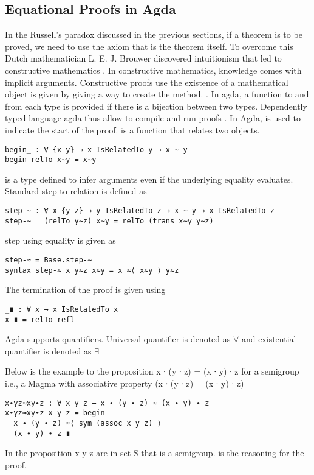 \subsection{Equational Proofs in Agda}
In the Russell's paradox discussed in the previous sections, if a theorem is to
be proved, we need to use the axiom that is the theorem itself. To overcome this
Dutch mathematician L. E. J. Brouwer discovered intuitionism that led to
constructive mathematics \cite{enwiki:1122615242}. In constructive mathematics,
knowledge comes with implicit arguments. Constructive proofs use the existence
of a mathematical object is given by giving a way to create the method.
\cite{enwiki:1090644431}. In agda, a function to and from each type is
provided if there is a bijection between two types. Dependently typed language
agda thus allow to compile and run proofs \cite{kidney2020finiteness}.  
In Agda,  is used to indicate the start of the proof.  is a
function that relates two objects. 
\begin{verbatim}
begin_ : ∀ {x y} → x IsRelatedTo y → x ∼ y
begin relTo x∼y = x∼y
\end{verbatim}
 is a type defined to infer arguments even if the underlying equality
evaluates. Standard step to relation is defined as 
\begin{verbatim}
step-∼ : ∀ x {y z} → y IsRelatedTo z → x ∼ y → x IsRelatedTo z
step-∼ _ (relTo y∼z) x∼y = relTo (trans x∼y y∼z)
\end{verbatim}
step using equality is given as
\begin{verbatim}
step-≈ = Base.step-∼
syntax step-≈ x y≈z x≈y = x ≈⟨ x≈y ⟩ y≈z
\end{verbatim}
The termination of the proof is given using 
\begin{verbatim}
_∎ : ∀ x → x IsRelatedTo x
x ∎ = relTo refl
\end{verbatim}
Agda supports quantifiers. Universal quantifier is denoted as \(\forall\) and
existential quantifier is denoted as \(\exists\) 

Below is the example to the proposition x ∙ (y ∙ z) = (x ∙ y) ∙ z  for a
semigroup i.e., a Magma with associative property (x ∙ (y ∙ z) = (x ∙ y) ∙ z) 
\begin{verbatim}
x∙yz≈xy∙z : ∀ x y z → x ∙ (y ∙ z) ≈ (x ∙ y) ∙ z
x∙yz≈xy∙z x y z = begin 
  x ∙ (y ∙ z) ≈⟨ sym (assoc x y z) ⟩ 
  (x ∙ y) ∙ z ∎
\end{verbatim}
In the proposition x y z are in set S that is a semigroup. 
is the reasoning for the proof. 

